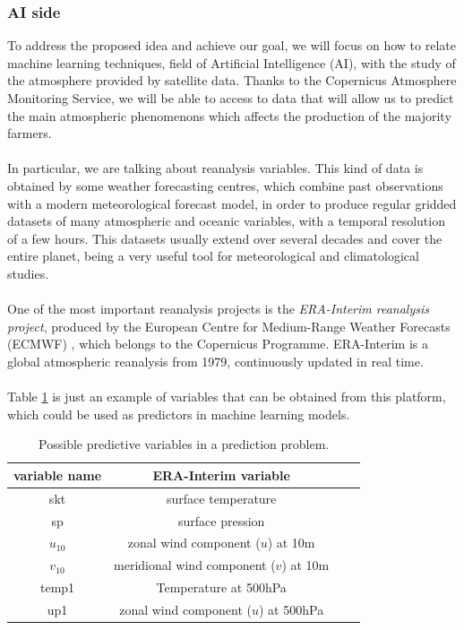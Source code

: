 \subsubsection{AI side}
To address the proposed idea and achieve our goal, we will focus on how to relate machine learning techniques, field of Artificial Intelligence (AI), with the study of the atmosphere provided by satellite data. Thanks to the Copernicus Atmosphere Monitoring Service, we will be able to access to data that will allow us to predict the main atmospheric phenomenons which affects the production of the majority farmers.\\\\
%
In particular, we are talking about reanalysis variables. This kind of data is obtained by some weather forecasting centres, which combine past observations with a modern meteorological forecast model, in order to produce regular gridded datasets of many atmospheric and oceanic variables, with a temporal resolution of a few hours. This datasets usually extend over several decades and cover the entire planet, being a very useful tool for meteorological and climatological studies.\\\\
%
One of the most important reanalysis projects is the {\em ERA-Interim reanalysis project}, produced by the European Centre for Medium-Range Weather Forecasts (ECMWF) \cite{ERA_Interim}, which belongs to the Copernicus Programme. ERA-Interim is a global atmospheric reanalysis from 1979, continuously updated in real time.\\\\
%
Table \ref{Variables_ERA} is just an example of variables that can be obtained from this platform, which could be used as predictors in machine learning models.

\vspace{12pt}
\begin{table}[H]
\begin{center}
\caption{\label{Variables_ERA} Possible predictive variables in a prediction problem.}
\begin{tabular}{cccc}
\hline
variable name & ERA-Interim variable\\
\hline
\hline
skt & surface temperature\\
sp & surface pression\\
$u_{10}$& zonal wind component ($u$) at 10m\\
$v_{10}$& meridional wind component ($v$) at 10m\\
temp1& Temperature at 500hPa\\
up1& zonal wind component ($u$) at 500hPa\\
\hline
\end{tabular}
\end{center}
\end{table}
\vspace{12pt}

